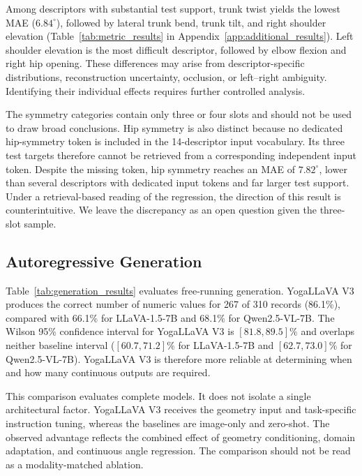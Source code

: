 \documentclass[conference]{IEEEtran}
\begin{document}
Among descriptors with substantial test support, trunk twist yields the lowest MAE ($6.84^\circ$), followed by lateral trunk bend, trunk tilt, and right shoulder elevation (Table~\ref{tab:metric_results} in Appendix~\ref{app:additional_results}).
Left shoulder elevation is the most difficult descriptor, followed by elbow flexion and right hip opening.
These differences may arise from descriptor-specific distributions, reconstruction uncertainty, occlusion, or left--right ambiguity.
Identifying their individual effects requires further controlled analysis.

The symmetry categories contain only three or four slots and should not be used to draw broad conclusions.
Hip symmetry is also distinct because no dedicated hip-symmetry token is included in the 14-descriptor input vocabulary.
Its three test targets therefore cannot be retrieved from a corresponding independent input token.
Despite the missing token, hip symmetry reaches an MAE of $7.82^\circ$, lower than several descriptors with dedicated input tokens and far larger test support.
Under a retrieval-based reading of the regression, the direction of this result is counterintuitive.
We leave the discrepancy as an open question given the three-slot sample.


\subsection{Autoregressive Generation}
\label{sec:generation_comparison}

Table~\ref{tab:generation_results} evaluates free-running generation.
YogaLLaVA V3 produces the correct number of numeric values for 267 of 310 records (86.1\%), compared with 66.1\% for LLaVA-1.5-7B and 68.1\% for Qwen2.5-VL-7B.
The Wilson 95\% confidence interval for YogaLLaVA V3 is $[81.8,89.5]\%$ and overlaps neither baseline interval ($[60.7,71.2]\%$ for LLaVA-1.5-7B and $[62.7,73.0]\%$ for Qwen2.5-VL-7B).
YogaLLaVA V3 is therefore more reliable at determining when and how many continuous outputs are required.

This comparison evaluates complete models.
It does not isolate a single architectural factor.
YogaLLaVA V3 receives the geometry input and task-specific instruction tuning, whereas the baselines are image-only and zero-shot.
The observed advantage reflects the combined effect of geometry conditioning, domain adaptation, and continuous angle regression.
The comparison should not be read as a modality-matched ablation.
\end{document}
